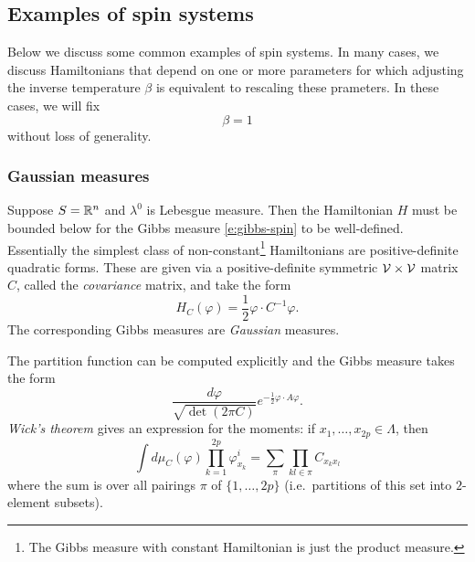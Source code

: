 \subsection{Examples of spin systems}

Below we discuss some common examples of spin systems.
In many cases, we discuss Hamiltonians that depend on one or more parameters
for which adjusting the inverse temperature $\beta$ is equivalent to rescaling
these prameters. In these cases, we will fix
\begin{equation}
\label{e:beta-one}
\beta = 1
\end{equation}
without loss of generality.

\subsubsection{Gaussian measures}

Suppose $S = {\mathbb R}^n$ and $\lambda^0$ is Lebesgue measure. Then the Hamiltonian
$H$ must be bounded below for the Gibbs measure \eqref{e:gibbs-spin} to be
well-defined. Essentially the simplest class of
non-constant\footnote{The Gibbs measure with constant Hamiltonian is just the
product measure.} Hamiltonians
are positive-definite quadratic forms. These are given via a positive-definite
symmetric $\mathcal{V}\times\mathcal{V}$ matrix $C$, called the \emph{covariance}
matrix, and take the form
\begin{equation}
H_C(\varphi) = \frac{1}{2} \varphi \cdot C^{-1} \varphi.
\end{equation}
The corresponding Gibbs measures are \emph{Gaussian} measures.

The partition function can be computed explicitly and the Gibbs measure takes
the form
\begin{equation}
\label{e:gauss-density}
\frac{d\varphi}{\sqrt{\det(2\pi C)}}
e^{-\tfrac12 \varphi \cdot A \varphi}.
\end{equation}
\emph{Wick's theorem} gives an expression for the moments:
if $x_1, \ldots, x_{2p} \in \Lambda$, then
\begin{equation}
\label{e:wick}
\int d\mu_C(\varphi) \prod_{k=1}^{2p} \varphi^i_{x_k}
	=
\sum_\pi \prod_{kl\in\pi} C_{x_kx_l}
\end{equation}
where the sum is over all pairings $\pi$ of $\{1,\ldots,2p\}$ (i.e.\ partitions of
this set into $2$-element subsets).

